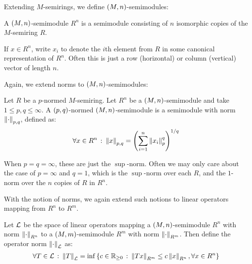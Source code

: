 Extending \(M\)-semirings,
we define \(\left(M, n\right)\)-semimodules:

\begin{definition}
  A \(\left(M, n\right)\)-semimodule \(R ^n\)
  is a semimodule consisting of \(n\) isomorphic copies of
  the \(M\)-semiring \(R\).
\end{definition}

If \(x \in R ^n\), write \(x_i\) to denote the \(i\)th element from
\(R\) in some canonical representation of \(R ^n\).
Often this is just a row (horizontal) or column (vertical)
vector of length \(n\).

Again, we extend norms to \(\left(M, n\right)\)-semimodules:

\begin{definition}
  Let \(R\) be a \(p\)-normed \(M\)-semiring.
  Let \(R ^n\) be a \(\left(M, n\right)\)-semimodule
  and take \(1 \leq p, q \leq \infty\).
  A \(\left(p, q\right)\)-normed \(\left(M, n\right)\)-semimodule
  is a semimodule with norm \(\left\lVert\cdot\right\rVert_{p, q}\),
  defined as:
  \begin{align*}
    \forall x \in R^n \ \colon
      \left\lVert x\right\rVert_{p, q}
        = \left(\sum_{i = 1}^{n} \left\lVert x_i\right\rVert_{p}^q\right)^{1 / q}
  \end{align*}
\end{definition}

When \(p = q = \infty\), these are just the \(\sup\)-norm.
Often we may only care about the case of \(p = \infty\) and \(q = 1\),
which is the \(\sup\)-norm over each \(R\),
and the \(1\)-norm over the \(n\) copies of \(R\) in \(R^n\).

With the notion of norms, we again extend such notions to
linear operators mapping from \(R^n\) to \(R^m\).

\begin{definition}
  Let \(\mathcal{L}\) be the space of linear operators mapping
  a \(\left(M, n\right)\)-semimodule \(R^n\) with norm \(\left\lVert\cdot\right\rVert_{R^n}\)
  to a \(\left(M, m\right)\)-semimodule \(R^m\) with norm \(\left\lVert\cdot\right\rVert_{R^m}\).
  Then define the operator norm \(\left\lVert\cdot\right\rVert_{\mathcal{L}}\) as:
  \begin{align*}
    \forall T \in \mathcal{L} \ \colon
      \left\lVert T\right\rVert_{\mathcal{L}} =
        \inf \left\{c \in \mathbb{R}_{\geq 0} \ \colon
                \left\lVert Tx\right\rVert_{R^m}
                  \leq c \left\lVert x\right\rVert_{R^n},
                \forall x \in R^n\right\}
  \end{align*}
\end{definition}


